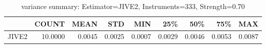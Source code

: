 \begin{table}[ht]
\centering
\caption{variance summary: Estimator=JIVE2, Instruments=333, Strength=0.70}
\begin{tabular}{lrrrrrrrr}
\toprule
 & COUNT & MEAN & STD & MIN & 25\% & 50\% & 75\% & MAX \\
\midrule
JIVE2 & 10.0000 & 0.0045 & 0.0025 & 0.0007 & 0.0029 & 0.0046 & 0.0053 & 0.0087 \\
\bottomrule
\end{tabular}
\end{table}
